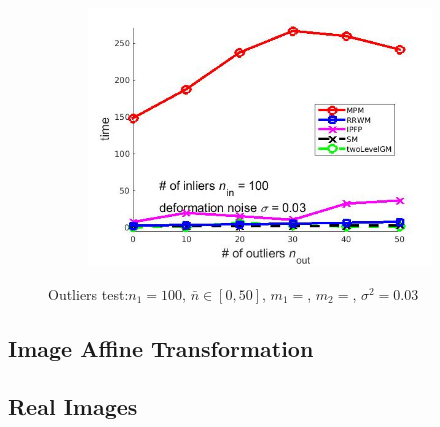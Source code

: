 \documentclass[
	fontsize=12pt,
	paper=a4,
	twoside=false,
	numbers=noenddot,
	plainheadsepline,
	toc=listof,
	toc=bibliography
]{scrartcl}
\begin{document}
\begin{figure}[ht]
\begin{subfigure}[b]{0.3\textwidth}
		\includegraphics[scale=0.25]{"fig_ver2008/syntheticPointSets/outliertest_n50/time_greedy"} 
	\end{subfigure} 	
	\caption{ Outliers test:$n_1=100$, $\bar{n}\in[0,50]$, $m_1=$, $m_2=$, $\sigma^2=0.03$}
\end{figure}


\subsection{Image Affine Transformation}


\subsection{Real Images}


	
\end{document}
